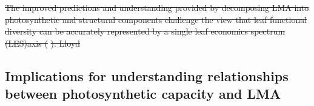 \documentclass[
  12pt,
  letterpaper, %
  DIV=11, %
  numbers=noendperiod]{scrartcl} %
\providecommand{\DIFdeltex}[1]{{\protect\color{red}\sout{#1}}}                      %
\providecommand{\DIFaddbegin}{} %
\providecommand{\DIFdelbegin}{} %
\providecommand{\DIFdelend}{} %
\providecommand{\DIFdel}[1]{\texorpdfstring{\DIFdeltex{#1}}{}} %
\newcommand{\DIFscaledelfig}{0.5}
\newlength{\DIFdelgraphicswidth} %
\newlength{\DIFdelgraphicsheight} %
\newcommand{\DIFaddincludegraphics}[2][]{{\color{blue}\fbox{\DIFOincludegraphics[#1]{#2}}}} %
\newcommand{\DIFdelincludegraphics}[2][]{%
\sbox{\DIFdelgraphicsbox}{\DIFOincludegraphics[#1]{#2}}%
\settoboxwidth{\DIFdelgraphicswidth}{\DIFdelgraphicsbox} %
\settoboxtotalheight{\DIFdelgraphicsheight}{\DIFdelgraphicsbox} %
\scalebox{\DIFscaledelfig}{%
\parbox[b]{\DIFdelgraphicswidth}{\usebox{\DIFdelgraphicsbox}\\[-\baselineskip] \rule{\DIFdelgraphicswidth}{0em}}\llap{\resizebox{\DIFdelgraphicswidth}{\DIFdelgraphicsheight}{%
\setlength{\unitlength}{\DIFdelgraphicswidth}%
\begin{picture}(1,1)%
\thicklines\linethickness{2pt} %
{\color[rgb]{1,0,0}\put(0,0){\framebox(1,1){}}}%
{\color[rgb]{1,0,0}\put(0,0){\line( 1,1){1}}}%
{\color[rgb]{1,0,0}\put(0,1){\line(1,-1){1}}}%
\end{picture}%
}\hspace*{3pt}}} %
} %
\DeclareRobustCommand{\DIFaddbegin}{\DIFOaddbegin \let\includegraphics\DIFaddincludegraphics} %
\DeclareRobustCommand{\DIFdelbegin}{\DIFOdelbegin \let\includegraphics\DIFdelincludegraphics} %
\DeclareRobustCommand{\DIFdelend}{\DIFOaddend \let\includegraphics\DIFOincludegraphics} %
\begin{document}
\DIFdelbegin \DIFdel{The improved predictions and understanding provided by decomposing LMA
into photosynthetic and structural components challenge the view that
leaf functional diversity can be accurately represented by a single leaf
economics spectrum (LES)axis
(}%
\DIFdel{). Lloyd }\DIFdelend \DIFaddbegin \hypertarget{implications-for-understanding-relationships-between-photosynthetic-capacity-and-lma}{%
\subsection{Implications for understanding relationships between
photosynthetic capacity and
LMA}\label{implications-for-understanding-relationships-between-photosynthetic-capacity-and-lma}}
\end{document}
